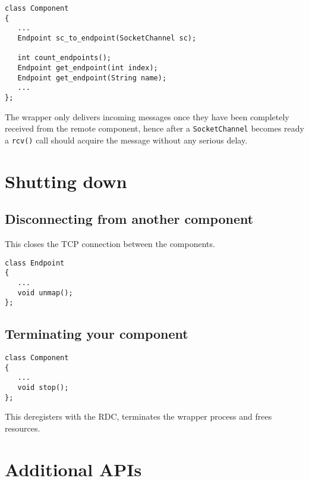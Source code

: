 \documentclass[12pt,a4paper,twoside]{article}
\renewcommand{\_}{\texttt{\symbol{95}}}
\begin{document}
\begin{verbatim}
class Component
{
   ...
   Endpoint sc_to_endpoint(SocketChannel sc);
   
   int count_endpoints();
   Endpoint get_endpoint(int index);
   Endpoint get_endpoint(String name);
   ...
};
\end{verbatim}

The wrapper only delivers incoming messages once they have been completely
received from the remote component, hence after a \verb^SocketChannel^
becomes ready a \verb^rcv()^ call should acquire the message without any
serious delay.


\section{Shutting down}

\subsection{Disconnecting from another component}

This closes the TCP connection between the components.

\begin{verbatim}
class Endpoint
{
   ...
   void unmap();
};
\end{verbatim}

\subsection{Terminating your component}

\begin{verbatim}
class Component
{
   ...
   void stop();
};
\end{verbatim}

This deregisters with the RDC, terminates the wrapper process and frees
resources.

\section{Additional APIs}
\end{document}
